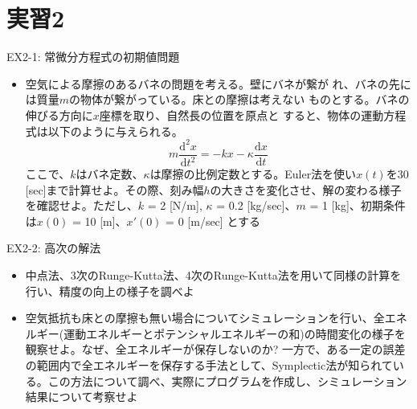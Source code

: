 \section{実習2}

\begin{frame}[t,fragile]{EX2-1: 常微分方程式の初期値問題}
  \begin{itemize}
    \setlength{\itemsep}{1em}
  \item[2-1-1] 空気による摩擦のあるバネの問題を考える。壁にバネが繋が
    れ、バネの先には質量$m$の物体が繋がっている。床との摩擦は考えない
    ものとする。バネの伸びる方向に$x$座標を取り、自然長の位置を原点と
    すると、物体の運動方程式は以下のように与えられる。
    \[
    m\frac{\mathrm{d} ^2x}{\mathrm{d} t^2} = -kx - \kappa \frac{\mathrm{d} x}{\mathrm{d} t} 
    \]
    ここで、$k$はバネ定数、$\kappa$は摩擦の比例定数とする。Euler法を使い$x(t)$を30 [sec]まで計算せよ。その際、刻み幅$h$の大きさを変化させ、解の変わる様子を確認せよ。ただし、$k$ = 2 [N/m], $\kappa$ = 0.2 [kg/sec]、$m$ = 1 [kg]、初期条件は$x(0)$ = 10 [m]、$x'(0)$ = 0 [m/sec] とする
  \end{itemize}
\end{frame}

\begin{frame}[t,fragile]{EX2-2: 高次の解法}
  \begin{itemize}
    \setlength{\itemsep}{1em}
  \item[2-2-1] 中点法、3次のRunge-Kutta法、4次のRunge-Kutta法を用いて同様の計算を行い、精度の向上の様子を調べよ
  \item[2-2-2] 空気抵抗も床との摩擦も無い場合についてシミュレーションを行い、全エネルギー(運動エネルギーとポテンシャルエネルギーの和)の時間変化の様子を観察せよ。なぜ、全エネルギーが保存しないのか? 一方で、ある一定の誤差の範囲内で全エネルギーを保存する手法として、Symplectic法が知られている。この方法について調べ、実際にプログラムを作成し、シミュレーション結果について考察せよ
  \end{itemize}
\end{frame}
